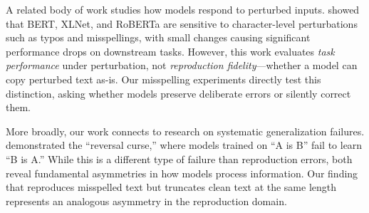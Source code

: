 A related body of work studies how models respond to perturbed inputs. \citet{moradi2021evaluating} showed that BERT, XLNet, and RoBERTa are sensitive to character-level perturbations such as typos and misspellings, with small changes causing significant performance drops on downstream tasks. However, this work evaluates \emph{task performance} under perturbation, not \emph{reproduction fidelity}---whether a model can copy perturbed text as-is. Our misspelling experiments directly test this distinction, asking whether models preserve deliberate errors or silently correct them.

More broadly, our work connects to research on systematic generalization failures. \citet{berglund2023reversal} demonstrated the ``reversal curse,'' where models trained on ``A is B'' fail to learn ``B is A.'' While this is a different type of failure than reproduction errors, both reveal fundamental asymmetries in how models process information. Our finding that \gptfull reproduces misspelled text but truncates clean text at the same length represents an analogous asymmetry in the reproduction domain.
